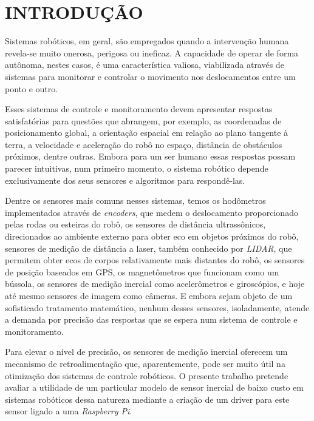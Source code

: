 \chapter*{INTRODUÇÃO}\label{chap:introducao}

Sistemas robóticos, em geral, são empregados quando a intervenção humana
revela-se muito onerosa, perigosa ou ineficaz. A capacidade de operar de forma
autônoma, nestes casos, é uma característica valiosa, viabilizada através de
sistemas para monitorar e controlar o movimento nos deslocamentos entre um
ponto e outro.

Esses sistemas de controle e monitoramento devem apresentar respostas
satisfatórias para questões que abrangem, por exemplo, as coordenadas de
posicionamento global, a orientação espacial em relação ao plano tangente à
terra, a velocidade e aceleração do robô no espaço, distância de obstáculos
próximos, dentre outras. Embora para um ser humano essas respostas possam
parecer intuitivas, num primeiro momento, o sistema robótico depende
exclusivamente dos seus sensores e algoritmos para respondê-las.

Dentre os sensores mais comuns nesses sistemas, temos os hodômetros
implementados através de \emph{encoders}, que medem o deslocamento
proporcionado pelas rodas ou esteiras do robô, os sensores de distância
ultrassônicos, direcionados ao ambiente externo para obter eco em objetos
próximos do robô, sensores de medição de distância a laser, também conhecido
por \emph{LIDAR}, que permitem obter ecos de corpos relativamente mais
distantes do robô, os sensores de posição baseados em GPS, os magnetômetros que
funcionam como um bússola, os sensores de medição inercial como acelerômetros e
giroscópios, e hoje até mesmo sensores de imagem como câmeras. E embora sejam
objeto de um sofisticado tratamento matemático, nenhum desses sensores,
isoladamente, atende a demanda por precisão das respostas que se espera num
sistema de controle e monitoramento.

Para elevar o nível de precisão, os sensores de medição inercial oferecem um
mecanismo de retroalimentação que, aparentemente, pode ser muito útil na
otimização dos sistemas de controle robóticos. O presente trabalho pretende
avaliar a utilidade de um particular modelo de sensor inercial de baixo custo
em sistemas robóticos dessa natureza mediante a criação de um driver para este
sensor ligado a uma \emph{Raspberry Pi}.
